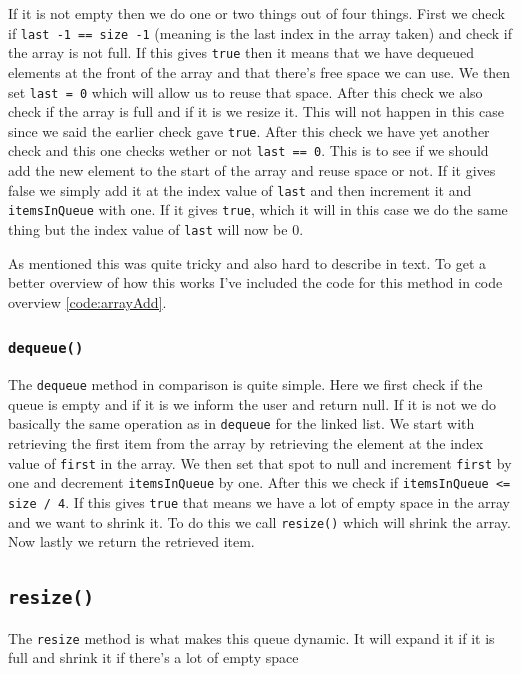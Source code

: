 \documentclass[a4paper,11pt]{article}
\begin{document}
If it is not empty then we do one or two things out of four things. First we check if {\tt last -1 == size -1}
(meaning is the last index in the array taken) and check if the array is not full. If this gives {\tt true} then it
means that we have dequeued elements at the front of the array and that there's free space we can use. We then set
    {\tt last = 0} which will allow us to reuse that space. After this check we also check if the array is full and
if it is we resize it. This will not happen in this case since we said the earlier check gave {\tt true}. After
this check we have yet another check and this one checks wether or not {\tt last == 0}. This is to see if we should
add the new element to the start of the array and reuse space or not. If it gives false we simply add it at the
index value of {\tt last} and then increment it and {\tt itemsInQueue} with one.  If it gives {\tt true}, which it will
in this case we do the same thing but the index value of {\tt last} will now be $0$.

As mentioned this was quite tricky and also hard to describe in text. To get a better overview of how this works I've
included the code for this method in code overview \ref{code:arrayAdd}.

\subsubsection{{\tt dequeue()}}
The {\tt dequeue} method in comparison is quite simple. Here we first check if the queue is empty and if it is we inform
the user and return null. If it is not we do basically the same operation as in {\tt dequeue} for the linked list. We
start with retrieving the first item from the array by retrieving the element at the index value of {\tt first} in
the array. We then set that spot to null and increment {\tt first} by one and decrement {\tt itemsInQueue} by one.
After this we check if {\tt itemsInQueue <= size / 4}. If this gives {\tt true} that means we have a lot of empty space
in the array and we want to shrink it. To do this we call {\tt resize()} which will shrink the array. Now lastly we
return the retrieved item.

\subsection{{\tt resize()}}
The {\tt resize} method is what makes this queue dynamic. It will expand it if it is full and shrink it if there's
a lot of empty space
\end{document}
